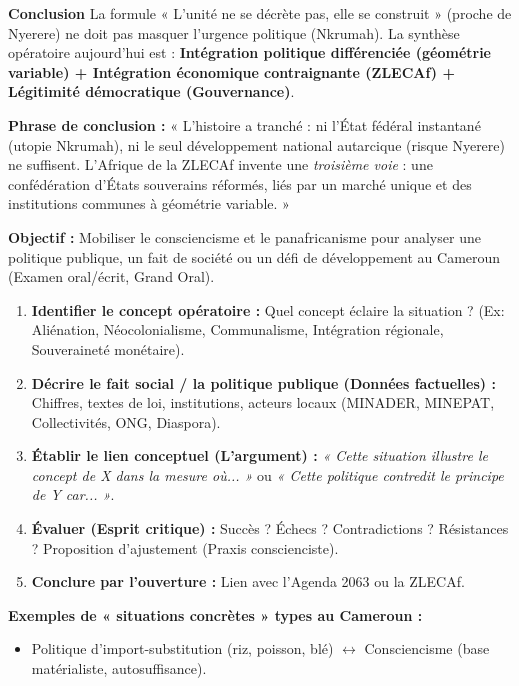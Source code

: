 \documentclass[11pt]{article}
\newcommand{\cle}[1]{{\popxbold\color{popdark}#1}}
\begin{document}
\begin{exoresolu}
\textbf{Conclusion}
La formule « L'unité ne se décrète pas, elle se construit » (proche de Nyerere) ne doit pas masquer l'urgence politique (Nkrumah). La synthèse opératoire aujourd'hui est : \textbf{Intégration politique différenciée (géométrie variable) + Intégration économique contraignante (ZLECAf) + Légitimité démocratique (Gouvernance)}.

\textbf{Phrase de conclusion :} « L'histoire a tranché : ni l'État fédéral instantané (utopie Nkrumah), ni le seul développement national autarcique (risque Nyerere) ne suffisent. L'Afrique de la ZLECAf invente une \emph{troisième voie} : une confédération d'États souverains réformés, liés par un marché unique et des institutions communes à géométrie variable. »
\end{exoresolu}

\begin{methode}
\textbf{Objectif :} Mobiliser le consciencisme et le panafricanisme pour analyser une politique publique, un fait de société ou un défi de développement au Cameroun (Examen oral/écrit, Grand Oral).
\begin{enumerate}
    \item \textbf{Identifier le concept opératoire :} Quel concept éclaire la situation ? (Ex: \cle{Aliénation}, \cle{Néocolonialisme}, \cle{Communalisme}, \cle{Intégration régionale}, \cle{Souveraineté monétaire}).
    \item \textbf{Décrire le fait social / la politique publique (Données factuelles) :} Chiffres, textes de loi, institutions, acteurs locaux (MINADER, MINEPAT, Collectivités, ONG, Diaspora).
    \item \textbf{Établir le lien conceptuel (L'argument) :} \emph{« Cette situation illustre le concept de X dans la mesure où... »} ou \emph{« Cette politique contredit le principe de Y car... »}.
    \item \textbf{Évaluer (Esprit critique) :} Succès ? Échecs ? Contradictions ? Résistances ? Proposition d'ajustement (Praxis conscienciste).
    \item \textbf{Conclure par l'ouverture :} Lien avec l'Agenda 2063 ou la ZLECAf.
\end{enumerate}
\textbf{Exemples de « situations concrètes » types au Cameroun :}
\begin{itemize}
    \item Politique d'import-substitution (riz, poisson, blé) $\leftrightarrow$ Consciencisme (base matérialiste, autosuffisance).

\end{itemize}
\end{methode}
\end{document}

